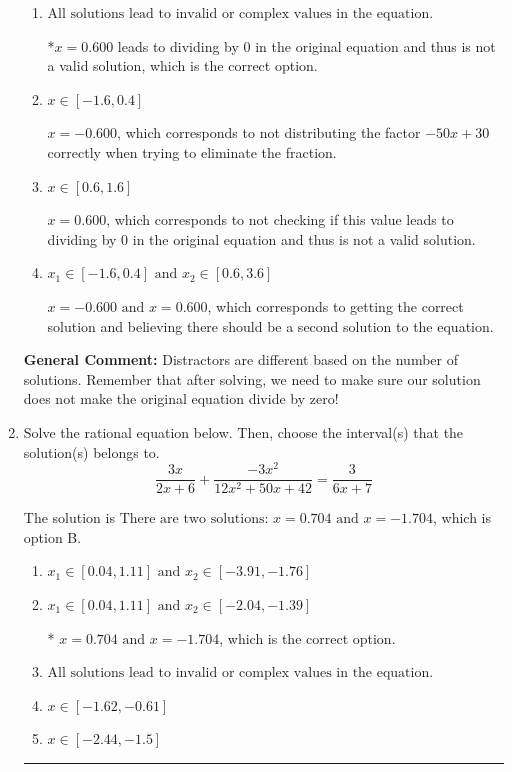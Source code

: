 \documentclass{extbook}[14pt]
\newcommand{\litem}[1]{\item #1

\rule{\textwidth}{0.4pt}}
\begin{document}
\begin{enumerate}
{\begin{enumerate}[label=\Alph*.]
$x = 0.600 \text{ and } x = 0.600$, which corresponds to getting the correct solution and believing there should be a second solution to the equation.
\item \( \text{All solutions lead to invalid or complex values in the equation.} \)

*$x = 0.600$ leads to dividing by 0 in the original equation and thus is not a valid solution, which is the correct option.
\item \( x \in [-1.6,0.4] \)

$x = -0.600$, which corresponds to not distributing the factor $-50x + 30$ correctly when trying to eliminate the fraction.
\item \( x \in [0.6,1.6] \)

$x = 0.600$, which corresponds to not checking if this value leads to dividing by 0 in the original equation and thus is not a valid solution.
\item \( x_1 \in [-1.6, 0.4] \text{ and } x_2 \in [0.6,3.6] \)

$x = -0.600 \text{ and } x = 0.600$, which corresponds to getting the correct solution and believing there should be a second solution to the equation.
\end{enumerate}

\textbf{General Comment:} Distractors are different based on the number of solutions. Remember that after solving, we need to make sure our solution does not make the original equation divide by zero!
}
\litem{
Solve the rational equation below. Then, choose the interval(s) that the solution(s) belongs to.
\[ \frac{3x}{2x + 6} + \frac{-3x^{2}}{12x^{2} +50 x + 42} = \frac{3}{6x + 7} \]

The solution is \( \text{There are two solutions: } x = 0.704 \text{ and } x = -1.704 \), which is option B.\begin{enumerate}[label=\Alph*.]
\item \( x_1 \in [0.04, 1.11] \text{ and } x_2 \in [-3.91,-1.76] \)


\item \( x_1 \in [0.04, 1.11] \text{ and } x_2 \in [-2.04,-1.39] \)

* $x = 0.704 \text{ and } x = -1.704$, which is the correct option.
\item \( \text{All solutions lead to invalid or complex values in the equation.} \)


\item \( x \in [-1.62,-0.61] \)


\item \( x \in [-2.44,-1.5] \)



\end{enumerate}}
\end{enumerate}
\end{document}
